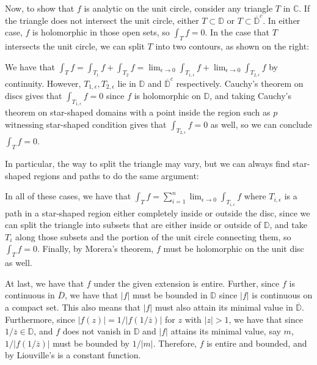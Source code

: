 \documentclass[12pt,letterpaper]{article}
\theoremstyle{definition}
\newcommand{\D}{\mathbb{D}}
\newcommand{\C}{\mathbb{C}}
\newcommand{\incfig}[1]{}
\begin{document}
Now, to show that $f$ is analytic on the unit circle, consider any triangle $T$ in $\C$. If the triangle does not intersect the unit circle, either $T \subset \D$ or $T \subset \overline{\D}^{c}$. In either case, $f$ is holomorphic in those open sets, so $\int_{T}f = 0$. In the case that $T$ intersects the unit circle, we can split $T$ into two contours, as shown on the right:
\begin{figure}[H]
  \centering
  \incfig{help}
\end{figure}

We have that $\int_{T}f = \int_{T_{1}}f + \int_{T_{2}}f = \lim_{\epsilon \rightarrow 0} \int_{T_{1,\epsilon}}f + \lim_{\epsilon \rightarrow 0} \int_{T_{2,\epsilon}}f$ by continuity. However, $T_{1,\epsilon}, T_{2,\epsilon}$ lie in $\D$ and $\overline{\D}^{c}$ respectively. Cauchy's theorem on discs gives that $\int_{T_{1,\epsilon}}f = 0$ since $f$ is holomorphic on $\D$, and taking Cauchy's theorem on star-shaped domains with a point inside the region such as $p$ witnessing star-shaped condition gives that $\int_{T_{2,\epsilon}}f = 0$ as well, so we can conclude $\int_{T}f = 0$.

In particular, the way to split the triangle may vary, but we can always find star-shaped regions and paths to do the same argument:
\begin{figure}[H]
  \centering
  \incfig{exotic}
\end{figure}
In all of these cases, we have that $\int_{T}f = \sum_{i=1}^{n} \lim_{\epsilon \rightarrow 0}\int_{T_{i,\epsilon}}f$ where $T_{i,\epsilon}$ is a path in a star-shaped region either completely inside or outside the disc, since we can split the triangle into subsets that are either inside or outside of $\D$, and take $T_{i}$ along those subsets and the portion of the unit circle connecting them, so $\int_{T}f = 0$. Finally, by Morera's theorem, $f$ must be holomorphic on the unit disc as well.

At last, we have that $f$ under the given extension is entire. Further, since $f$ is continuous in $\overline{D}$, we have that $|f|$ must be bounded in $\D$ since $|f|$ is continuous on a compact set. This also means that $|f|$ must also attain its minimal value in $\overline{\D}$. Furthermore, since $|f(z)| = 1/|f(1/\overline{z})|$ for $z$ with $|z| > 1$, we have that since $1/\overline{z} \in \D$, and $f$ does not vanish in $\D$ and $|f|$ attains its minimal value, say $m$, $1/|f(1/\overline{z})|$ must be bounded by $1/|m|$. Therefore, $f$ is entire and bounded, and by Liouville's is a constant function.
\end{document}
